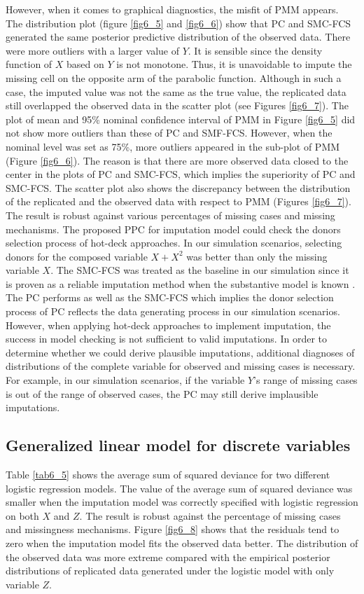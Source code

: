 	However, when it comes to graphical diagnostics, the misfit of PMM appears. The distribution plot (figure \ref{fig6_5} and \ref{fig6_6}) show that PC and SMC-FCS generated the same posterior predictive distribution of the observed data. There were more outliers with a larger value of $Y$. It is sensible since the density function of $X$ based on $Y$ is not monotone. Thus, it is unavoidable to impute the missing cell on the opposite arm of the parabolic function. Although in such a case, the imputed value was not the same as the true value, the replicated data still overlapped the observed data in the scatter plot (see Figures \ref{fig6_7}). The plot of mean and 95\% nominal confidence interval of PMM in Figure \ref{fig6_5} did not show more outliers than these of PC and SMF-FCS. However, when the nominal level was set as 75\%, more outliers appeared in the sub-plot of PMM (Figure \ref{fig6_6}). The reason is that there are more observed data closed to the center in the plots of PC and SMC-FCS, which implies the superiority of PC and SMC-FCS. The scatter plot also shows the discrepancy between the distribution of the replicated and the observed data with respect to PMM (Figures \ref{fig6_7}). The result is robust against various percentages of missing cases and missing mechanisms. The proposed PPC for imputation model could check the donors selection process of hot-deck approaches. In our simulation scenarios, selecting donors for the composed variable $X + X^2$ was better than only the missing variable $X$. The SMC-FCS was treated as the baseline in our simulation since it is proven as a reliable imputation method when the substantive model is known \citep{bartlett2015multiple}. The PC performs as well as the SMC-FCS which implies the donor selection process of PC reflects the data generating process in our simulation scenarios. However, when applying hot-deck approaches to implement imputation, the success in model checking is not sufficient to valid imputations. In order to determine whether we could derive plausible imputations, additional diagnoses of distributions of the complete variable for observed and missing cases is necessary. For example, in our simulation scenarios, if the variable $Y$'s range of missing cases is out of the range of observed cases, the PC may still derive implausible imputations. 
	
	\subsection{Generalized linear model for discrete variables}
	Table \ref{tab6_5} shows the average sum of squared deviance for two different logistic regression models. The value of the average sum of squared deviance was smaller when the imputation model was correctly specified with logistic regression on both $X$ and $Z$. The result is robust against the percentage of missing cases and missingness mechanisms. Figure \ref{fig6_8} shows that the residuals tend to zero when the imputation model fits the observed data better. The distribution of the observed data was more extreme compared with the empirical posterior distributions of replicated data generated under the logistic model with only variable $Z$. 
	
